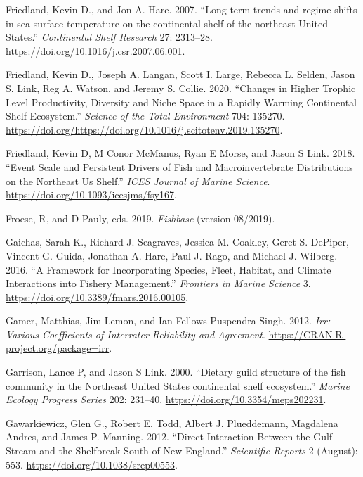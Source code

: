 \documentclass[
]{book}
\begin{document}
\leavevmode\hypertarget{ref-Friedland2007}{}%
Friedland, Kevin D., and Jon A. Hare. 2007. ``Long-term trends and regime shifts in sea surface temperature on the continental shelf of the northeast United States.'' \emph{Continental Shelf Research} 27: 2313--28. \url{https://doi.org/10.1016/j.csr.2007.06.001}.

\leavevmode\hypertarget{ref-friedland2020}{}%
Friedland, Kevin D., Joseph A. Langan, Scott I. Large, Rebecca L. Selden, Jason S. Link, Reg A. Watson, and Jeremy S. Collie. 2020. ``Changes in Higher Trophic Level Productivity, Diversity and Niche Space in a Rapidly Warming Continental Shelf Ecosystem.'' \emph{Science of the Total Environment} 704: 135270. \url{https://doi.org/https://doi.org/10.1016/j.scitotenv.2019.135270}.

\leavevmode\hypertarget{ref-Friedland2018}{}%
Friedland, Kevin D, M Conor McManus, Ryan E Morse, and Jason S Link. 2018. ``Event Scale and Persistent Drivers of Fish and Macroinvertebrate Distributions on the Northeast Us Shelf.'' \emph{ICES Journal of Marine Science}. \url{https://doi.org/10.1093/icesjms/fsy167}.

\leavevmode\hypertarget{ref-froese2019fishbase}{}%
Froese, R, and D Pauly, eds. 2019. \emph{Fishbase} (version 08/2019).

\leavevmode\hypertarget{ref-gaichas_framework_2016}{}%
Gaichas, Sarah K., Richard J. Seagraves, Jessica M. Coakley, Geret S. DePiper, Vincent G. Guida, Jonathan A. Hare, Paul J. Rago, and Michael J. Wilberg. 2016. ``A Framework for Incorporating Species, Fleet, Habitat, and Climate Interactions into Fishery Management.'' \emph{Frontiers in Marine Science} 3. \url{https://doi.org/10.3389/fmars.2016.00105}.

\leavevmode\hypertarget{ref-irr}{}%
Gamer, Matthias, Jim Lemon, and Ian Fellows Puspendra Singh. 2012. \emph{Irr: Various Coefficients of Interrater Reliability and Agreement}. \url{https://CRAN.R-project.org/package=irr}.

\leavevmode\hypertarget{ref-garrison2000dietary}{}%
Garrison, Lance P, and Jason S Link. 2000. ``Dietary guild structure of the fish community in the Northeast United States continental shelf ecosystem.'' \emph{Marine Ecology Progress Series} 202: 231--40. \url{https://doi.org/10.3354/meps202231}.

\leavevmode\hypertarget{ref-gawarkiewicz_direct_2012}{}%
Gawarkiewicz, Glen G., Robert E. Todd, Albert J. Plueddemann, Magdalena Andres, and James P. Manning. 2012. ``Direct Interaction Between the Gulf Stream and the Shelfbreak South of New England.'' \emph{Scientific Reports} 2 (August): 553. \url{https://doi.org/10.1038/srep00553}.
\end{document}
